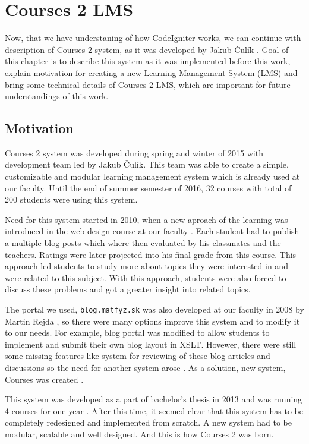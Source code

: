\chapter{Courses 2 LMS}
\label{sec:courses}

Now, that we have understaning of how CodeIgniter works, we can continue with description of Courses 2 system, as it was developed by Jakub \v{C}ul\'{i}k \cite{culik}. Goal of this chapter is to describe this system as it was implemented before this work, explain motivation for creating a new Learning Management System (LMS) and bring some technical details of Courses 2 LMS, which are important for future understandings of this work.

\section{Motivation}

Courses 2 system was developed during spring and winter of 2015 with development team led by Jakub \v{C}ul\'{i}k. This team was able to create a simple, customizable and modular learning management system which is already used at our faculty. Until the end of summer semester of 2016, 32 courses with total of 200 students were using this system.


Need for this system started in 2010, when a new aproach of the learning was introduced in the web design course at our faculty \cite{culik}. Each student had to publish a multiple blog posts which where then evaluated by his classmates and  the teachers. Ratings were later projected into his final grade from this course. This approach led students to study more about topics they were interested in and were related to this subject. With this approach, students were also forced to discuss these problems and got a greater insight into related topics.

The portal we used, \texttt{blog.matfyz.sk} was also developed at our faculty in 2008 by Martin Rejda \cite{rejda}, so there were many options improve this system and to modify it to our needs. For example, blog portal was modified to allow students to implement and submit their own blog layout in XSLT. Hovewer, there were still some missing features like system for reviewing of these blog articles and discussions so the need for another system arose \cite{culik}. As a solution, new system, Courses was created \cite{culikbc}.


This system was developed as a part of bachelor's thesis in 2013 \cite{culikbc} and was running 4 courses for one year \cite{culik}. After this time, it seemed clear that this system has to be completely redesigned and implemented from scratch. A new system had to be modular, scalable and well designed. And this is how Courses 2 was born.

